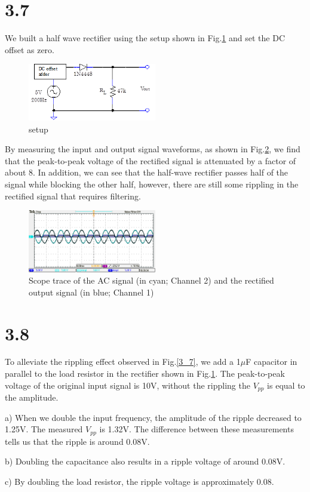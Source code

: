 \documentclass[authoryear, 12pt,5p, times]{elsarticle}
\begin{document}
\section*{3.7}\label{3_7_q}
We built a half wave rectifier using the setup shown in Fig.\ref{3_7_setup} and set the DC offset as zero. 
\begin{figure}[h!]
\center
\includegraphics[width=0.5\textwidth]{figure/3_7_setup}
\caption{ setup}
\label{3_7_setup}
\end{figure}
By measuring the input and output signal waveforms, as shown in Fig.\ref{3_7_trace}, we find that the peak-to-peak voltage of the rectified signal is attenuated by a factor of about 8. In addition, we can see that the half-wave rectifier passes half of the signal while blocking the other half, however, there are still some rippling in the rectified signal that requires filtering.
\begin{figure}[h!]
\center
\includegraphics[width=0.5\textwidth]{figure/3_7}
\caption{Scope trace of the AC signal (in cyan; Channel 2) and the rectified output signal (in blue; Channel 1)}
\label{3_7_trace}
\end{figure}
\section*{3.8}
To alleviate the rippling effect observed in Fig.\ref{3_7}, we add a 1$\mu$F capacitor in parallel to the load resistor in the rectifier shown in Fig.\ref{3_7_setup}. The peak-to-peak voltage of the original input signal  is 10V, without the rippling the $V_{pp}$ is equal to the amplitude.
\par a) When we double the input frequency, the amplitude of the ripple  decreased to 1.25V. The measured $V_{pp}$ is 1.32V. The difference between these measurements tells us that the ripple is around 0.08V.  
\par  b) Doubling the capacitance also results in a ripple voltage of around 0.08V.
\par c) By doubling the load resistor, the ripple  voltage is approximately 0.08.
\end{document}
